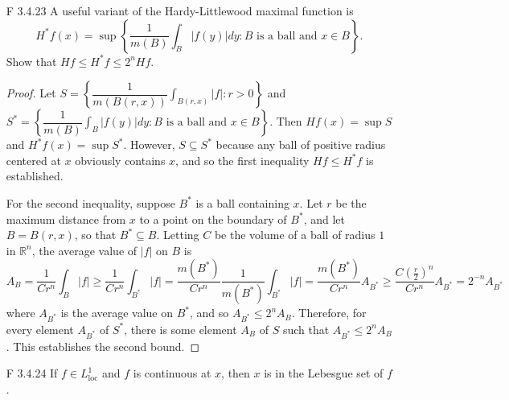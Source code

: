 \documentclass[10pt]{article}
\newcommand{\R}{\mathbb{R}}
\newcommand{\Int}{{\displaystyle \int}}
\begin{document}
\begin{enumerate}
\begin{proof}
For the second statement, choose $\alpha < CR^{-n}$.  If $R^n < |x|^n < \frac{C}{\alpha}$, then 
\begin{enumerate}
\item $|x| > R$ and so the bound $Hf(x) \geq C|x|^{-n}$ holds, and
\item $C|x|^{-n} > \alpha$ and so $x \in \{x : Hf(x) > \alpha\}$.
Therefore, $B_{(C/\alpha)^{1/n}} \setminus B_R \subseteq \{x : Hf(x) > \alpha\}$, where both of these balls are centered at 0.  This gives us the bound
\begin{align*}
m(\{x : Hf(x) > \alpha \}) \geq m(B_{(C/\alpha)^{1/n}}) - m(B_R)
= m(B_1)\left( \frac{C}{\alpha} - R^n\right)
> \frac{m(B_1)C}{\alpha}
\end{align*}
and so taking $C' = m(B_1)C$ suffices.
\end{enumerate}
\end{proof}

\item[F 3.4.23] A useful variant of the Hardy-Littlewood maximal function is
$$
H^*f(x) = \sup \left\{ \frac{1}{m(B)} \Int_B |f(y)|dy : B \text{ is a ball and } x \in B \right\}.
$$
Show that $Hf \leq H^*f \leq 2^nHf$.

\begin{proof}
Let $S = \left\{\dfrac{1}{m(B(r,x))} \Int_{B(r,x)} |f| : r > 0\right\}$ and $S^* = \left\{ \dfrac{1}{m(B)} \Int_B |f(y)|dy : B \text{ is a ball and } x \in B \right\}$.  Then $Hf(x) = \sup S$ and $H^*f(x) = \sup S^*$.  However, $S \subseteq S^*$ because any ball of positive radius centered at $x$ obviously contains $x$, and so the first inequality $Hf \leq H^*f$ is established.

For the second inequality, suppose $B^*$ is a ball containing $x$.  Let $r$ be the maximum distance from $x$ to a point on the boundary of $B^*$, and let $B = B(r,x)$, so that $B^* \subseteq B$.  Letting $C$ be the volume of a ball of radius $1$ in $\R^n$, the average value of $|f|$ on $B$ is
$$
A_B = \frac{1}{Cr^n}\Int_B |f| \geq \frac{1}{Cr^n} \Int_{B^*} |f| = \frac{m(B^*)}{Cr^n} \frac{1}{m(B^*)} \Int_{B^*} |f| = \frac{m(B^*)}{Cr^n} A_{B^*} \geq \frac{C(\frac{r}{2})^n}{Cr^n} A_{B^*} = 2^{-n} A_{B^*}
$$
where $A_{B^*}$ is the average value on $B^*$, and so $A_{B^*} \leq 2^n A_B$.  Therefore, for every element $A_{B^*}$ of $S^*$, there is some element $A_B$ of $S$ such that $A_{B^*} \leq 2^n A_B$.  This establishes the second bound.
\end{proof}

\item[F 3.4.24] If $f \in L_{\text{loc}}^1$ and $f$ is continuous at $x$, then $x$ is in the Lebesgue set of $f$.


\end{enumerate}
\end{document}
